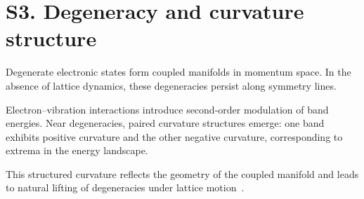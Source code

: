\documentclass[12pt]{article}
\begin{document}
\section*{S3. Degeneracy and curvature structure}

Degenerate electronic states form coupled manifolds in momentum space. In the absence of lattice dynamics, these degeneracies persist along symmetry lines.

Electron--vibration interactions introduce second-order modulation of band energies. Near degeneracies, paired curvature structures emerge: one band exhibits positive curvature and the other negative curvature, corresponding to extrema in the energy landscape.

This structured curvature reflects the geometry of the coupled manifold and leads to natural lifting of degeneracies under lattice motion~\cite{Giustino2017,Yarkony1996}.






\end{document}
